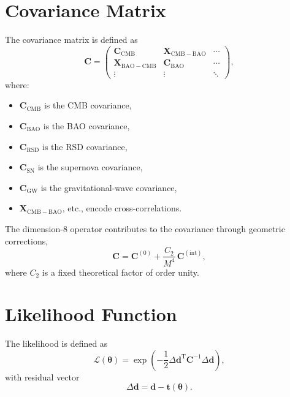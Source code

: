\documentclass[11pt,a4paper]{article}
\begin{document}
\section[Covariance Matrix]{Covariance Matrix}

The covariance matrix is defined as
\begin{equation}
\mathbf{C}
=
\begin{pmatrix}
\mathbf{C}_{\mathrm{CMB}} & \mathbf{X}_{\mathrm{CMB-BAO}} & \cdots \\
\mathbf{X}_{\mathrm{BAO-CMB}} & \mathbf{C}_{\mathrm{BAO}} & \cdots \\
\vdots & \vdots & \ddots
\end{pmatrix},
\end{equation}
where:
\begin{itemize}[leftmargin=0.8cm]
  \item $\mathbf{C}_{\mathrm{CMB}}$ is the CMB covariance,
  \item $\mathbf{C}_{\mathrm{BAO}}$ is the BAO covariance,
  \item $\mathbf{C}_{\mathrm{RSD}}$ is the RSD covariance,
  \item $\mathbf{C}_{\mathrm{SN}}$ is the supernova covariance,
  \item $\mathbf{C}_{\mathrm{GW}}$ is the gravitational-wave covariance,
  \item $\mathbf{X}_{\mathrm{CMB-BAO}}$, etc., encode cross-correlations.
\end{itemize}

The dimension-8 operator contributes to the covariance through geometric
corrections,
\begin{equation}
\mathbf{C}
=
\mathbf{C}^{(0)}
+
\frac{C_2}{M^4} \, \mathbf{C}^{(\mathrm{int})},
\end{equation}
where $C_2$ is a fixed theoretical factor of order unity.

\section[Likelihood Function]{Likelihood Function}

The likelihood is defined as
\begin{equation}
\mathcal{L}(\boldsymbol{\theta})
=
\exp\left(
-\frac{1}{2}
\Delta\mathbf{d}^{\mathrm{T}}
\mathbf{C}^{-1}
\Delta\mathbf{d}
\right),
\end{equation}
with residual vector
\begin{equation}
\Delta\mathbf{d}
=
\mathbf{d}
-
\mathbf{t}(\boldsymbol{\theta}).
\end{equation}
\end{document}
